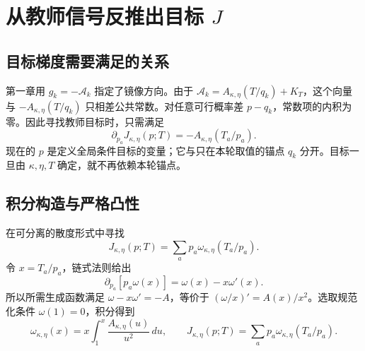 \chapter{从教师信号反推出目标 \texorpdfstring{$J$}{J}}
\label{ch:objective}
\section{目标梯度需要满足的关系}
第一章用 $g_k=-\mathcal A_k$ 指定了镜像方向。由于 $\mathcal A_k=A_{\kappa,\eta}(T/q_k)+K_T$，这个向量与 $-A_{\kappa,\eta}(T/q_k)$ 只相差公共常数。对任意可行概率差 $p-q_k$，常数项的内积为零。因此寻找教师目标时，只需满足
\begin{equation}
\partial_{p_a}J_{\kappa,\eta}(p;T)
=-A_{\kappa,\eta}(T_a/p_a).
\label{eq:J-gradient}
\end{equation}
现在的 $p$ 是定义全局条件目标的变量；它与只在本轮取值的锚点 $q_k$ 分开。目标一旦由 $\kappa,\eta,T$ 确定，就不再依赖本轮锚点。

\section{积分构造与严格凸性}
在可分离的散度形式中寻找
\begin{equation}
J_{\kappa,\eta}(p;T)=\sum_ap_a\omega_{\kappa,\eta}(T_a/p_a).
\end{equation}
令 $x=T_a/p_a$，链式法则给出
\begin{equation}
\partial_{p_a}[p_a\omega(x)]=\omega(x)-x\omega'(x).
\end{equation}
所以所需生成函数满足 $\omega-x\omega'=-A$，等价于 $(\omega/x)'=A(x)/x^2$。选取规范化条件 $\omega(1)=0$，积分得到
\begin{equation}
\boxed{
\omega_{\kappa,\eta}(x)=x\int_1^x\frac{A_{\kappa,\eta}(u)}{u^2}\,du,
\qquad J_{\kappa,\eta}(p;T)=\sum_ap_a\omega_{\kappa,\eta}(T_a/p_a).
}
\label{eq:J}
\end{equation}

